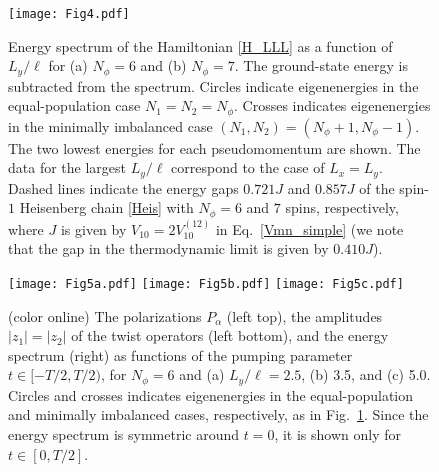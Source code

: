 \documentclass[aps,prb,twocolumn,superscriptaddress,showpacs,floatfix]{revtex4-1}
\begin{document}
\begin{figure}
\texttt{[image: Fig4.pdf]}
\caption{Energy spectrum of the Hamiltonian \eqref{H_LLL} as a function of $L_y/\ell$ for (a) $N_\phi=6$ and (b) $N_\phi=7$. 
The ground-state energy is subtracted from the spectrum. 
Circles indicate eigenenergies in the equal-population case $N_1=N_2=N_\phi$. 
Crosses indicates eigenenergies in the minimally imbalanced case $(N_1,N_2)=(N_\phi+1,N_\phi-1)$. 
The two lowest energies for each pseudomomentum are shown. 
The data for the largest $L_y/\ell$ correspond to the case of $L_x=L_y$. 
Dashed lines indicate the energy gaps $0.721 J$ and $0.857 J$ of the spin-$1$ Heisenberg chain \eqref{Heis} with $N_\phi=6$ and $7$ spins, respectively, where $J$ is given by $V_{10}=2V_{10}^{(12)}$ in Eq.~\eqref{Vmn_simple} (we note that the gap in the thermodynamic limit\cite{WhiteHuse,Golinelli} is given by $0.410 J$). 
}
\label{fig_spec_Ly}
\end{figure}

\begin{figure}
\texttt{[image: Fig5a.pdf]}
\texttt{[image: Fig5b.pdf]}
\texttt{[image: Fig5c.pdf]}
\caption{(color online) The polarizations $P_\alpha$ (left top), the amplitudes $|z_1|=|z_2|$ of the twist operators (left bottom), and the energy spectrum (right) as functions of the pumping parameter $t\in [-T/2,T/2)$, for $N_\phi=6$ and (a) $L_y/\ell=2.5$, (b) 3.5, and (c) 5.0. 
Circles and crosses indicates eigenenergies in the equal-population and minimally imbalanced cases, respectively, as in Fig.~\ref{fig_spec_Ly}. 
Since the energy spectrum is symmetric around $t=0$, it is shown only for $t\in [0,T/2]$. 
}
\label{fig_pol_phi}
\end{figure}
\end{document}
